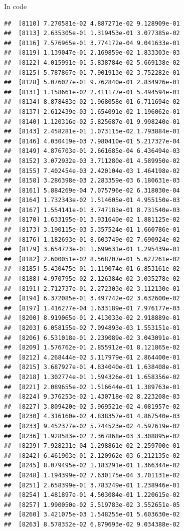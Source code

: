 \documentclass[ignorenonframetext,]{beamer}
\begin{document}
\begin{frame}[fragile]{In code}
\begin{verbatim}
##  [8110] 7.270581e-02 4.887271e-02 9.128909e-01
##  [8113] 2.635305e-01 1.319453e-01 3.077385e-02
##  [8116] 7.576965e-01 3.774172e-04 9.041633e-01
##  [8119] 1.139047e-01 2.169859e-02 1.833303e-03
##  [8122] 4.015991e-01 5.838784e-02 5.669138e-02
##  [8125] 5.787867e-01 7.901913e-02 3.752282e-01
##  [8128] 5.076027e-01 9.762840e-01 2.834926e-01
##  [8131] 1.158661e-02 2.411177e-01 5.494594e-01
##  [8134] 8.878483e-02 1.968058e-01 6.711694e-02
##  [8137] 2.612439e-03 1.654091e-02 1.196062e-01
##  [8140] 1.120316e-02 5.825687e-01 9.998240e-01
##  [8143] 2.458281e-01 1.073115e-02 1.793884e-01
##  [8146] 4.030419e-03 7.980410e-01 5.217327e-04
##  [8149] 4.876703e-01 2.661685e-04 6.436494e-03
##  [8152] 3.072932e-03 3.711280e-01 4.589950e-02
##  [8155] 7.402454e-03 2.420104e-03 1.464198e-02
##  [8158] 3.286398e-03 2.283359e-03 6.180631e-03
##  [8161] 5.884269e-04 7.075796e-02 6.318030e-04
##  [8164] 1.732343e-02 1.514605e-01 4.955150e-03
##  [8167] 1.554141e-01 3.747183e-01 8.731540e-03
##  [8170] 1.633195e-01 3.931640e-02 1.881125e-02
##  [8173] 3.190115e-03 5.357524e-01 1.660786e-01
##  [8176] 1.182693e-01 8.603749e-02 7.690924e-02
##  [8179] 3.654723e-01 1.699631e-01 1.295439e-01
##  [8182] 2.600051e-02 8.568707e-01 5.627261e-02
##  [8185] 5.430475e-01 1.119074e-01 6.853161e-02
##  [8188] 4.970795e-02 2.126384e-02 3.035278e-02
##  [8191] 2.712737e-01 2.272303e-02 3.112130e-01
##  [8194] 6.372085e-01 3.497742e-02 3.632600e-02
##  [8197] 1.416277e-04 1.633189e-01 7.976177e-03
##  [8200] 8.919065e-01 2.413033e-02 2.918889e-01
##  [8203] 6.058155e-02 7.094893e-03 1.553151e-01
##  [8206] 6.531018e-01 2.239089e-02 3.043091e-01
##  [8209] 1.576762e-01 2.855912e-01 8.121865e-02
##  [8212] 4.268444e-02 5.117979e-01 2.864400e-01
##  [8215] 3.687927e-01 4.834040e-01 1.638408e-01
##  [8218] 1.302774e-01 1.594326e-01 1.658356e-02
##  [8221] 2.089655e-02 1.516644e-01 1.389763e-01
##  [8224] 9.376253e-02 1.430718e-02 8.223208e-03
##  [8227] 3.809420e-02 5.969521e-02 4.081957e-02
##  [8230] 4.316160e-02 4.838357e-01 4.867540e-03
##  [8233] 9.452377e-02 5.744523e-02 4.597619e-02
##  [8236] 1.928583e-02 2.367868e-03 3.308895e-02
##  [8239] 7.928231e-04 1.298861e-02 2.259700e-01
##  [8242] 6.461903e-01 2.120962e-03 6.212135e-02
##  [8245] 8.079495e-02 1.183291e-01 1.366344e-02
##  [8248] 1.194399e-02 7.630175e-04 3.701131e-02
##  [8251] 2.658399e-01 3.783249e-01 1.238946e-01
##  [8254] 1.481897e-01 4.503084e-01 1.220615e-02
##  [8257] 1.990050e-02 5.519783e-02 3.552651e-05
##  [8260] 3.421075e-03 1.548255e-01 5.603630e-02
##  [8263] 8.578352e-02 6.879693e-02 9.034388e-02

\end{verbatim}
\end{frame}
\end{document}
